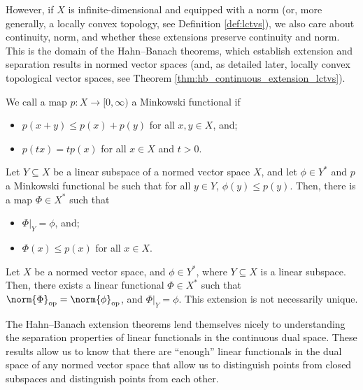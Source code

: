 However, if $X$ is infinite-dimensional and equipped with a norm (or, more generally, a locally convex topology, see Definition \ref{def:lctvs}), we also care about continuity, norm, and whether these extensions preserve continuity and norm. This is the domain of the Hahn--Banach theorems, which establish extension and separation results in normed vector spaces (and, as detailed later, locally convex topological vector spaces, see Theorem \ref{thm:hb_continuous_extension_lctvs}).
\begin{definition}
  We call a map $p\colon X\rightarrow [0,\infty)$ a Minkowski functional if
  \begin{itemize}
    \item $p\left(x + y\right)\leq p\left(x\right) + p\left(y\right)$ for all $x,y\in X$, and;
    \item $p\left(tx\right) = tp\left(x\right)$ for all $x\in X$ and $t > 0$.
  \end{itemize}
\end{definition}
\begin{theorem}\label{thm:hbm_extension}
  Let $Y\subseteq X$ be a linear subspace of a normed vector space $X$, and let $\phi\in Y^{\ast}$ and $p$ a Minkowski functional be such that for all $y\in Y$, $\phi\left(y\right) \leq p\left(y\right)$. Then, there is a map $\Phi\in X^{\ast}$ such that
  \begin{itemize}
    \item $\Phi|_{Y} = \phi$, and;
    \item $\Phi\left(x\right) \leq p\left(x\right)$ for all $x\in X$.
  \end{itemize}
\end{theorem}
\begin{theorem}\label{thm:hb_continuous_extension}
  Let $X$ be a normed vector space, and $\phi\in Y^{\ast}$, where $Y\subseteq X$ is a linear subspace. Then, there exists a linear functional $\Phi\in X^{\ast}$ such that $\norm{\Phi}_{\op} = \norm{\phi}_{\op}$, and $\Phi|_{Y} = \phi$. This extension is not necessarily unique.
\end{theorem}
The Hahn--Banach extension theorems lend themselves nicely to understanding the separation properties of linear functionals in the continuous dual space. These results allow us to know that there are ``enough'' linear functionals in the dual space of any normed vector space that allow us to distinguish points from closed subspaces and distinguish points from each other.
